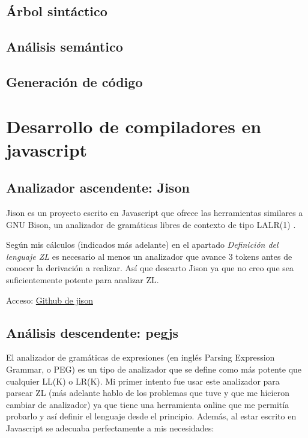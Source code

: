 \documentclass{report}
\begin{document}
	\subsection{Árbol sintáctico}
	
	\subsection{Análisis semántico}
	
	\subsection{Generación de código}

	\section{Desarrollo de compiladores en javascript}
	
	
	\subsection{Analizador ascendente: Jison}
	
	Jison es un proyecto escrito en Javascript que ofrece las herramientas similares a GNU Bison, un analizador de gramáticas libres de contexto de tipo LALR(1) \cite{bison}.
	
	Según mis cálculos (indicados más adelante) en el apartado \textit{Definición del lenguaje ZL} es necesario al menos un analizador que avance 3 tokens antes de conocer la derivación a realizar. Así que descarto Jison ya que no creo que sea suficientemente potente para analizar ZL. 
	
	Acceso:
	\href{https://github.com/zaach/jison}{Github de jison}	
	
	\subsection{Análisis descendente: pegjs}
	
	El analizador de gramáticas de expresiones\cite{peg} (en inglés Parsing Expression Grammar, o PEG) es un tipo de analizador que se define como más potente que cualquier LL(K) o LR(K)\cite{pegjs}. Mi primer intento fue usar este analizador para parsear ZL (más adelante hablo de los problemas que tuve y que me hicieron cambiar de analizador) ya que tiene una herramienta online que me permitía probarlo y así definir el lenguaje desde el principio. Además, al estar escrito en Javascript se adecuaba perfectamente a mis necesidades:
	
\end{document}
